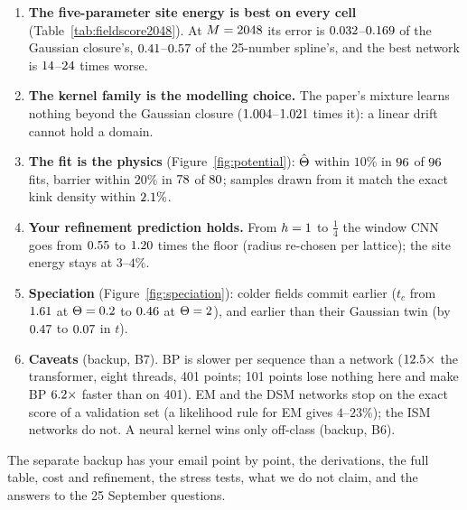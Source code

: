 \documentclass[11pt,a4paper]{article}
\begin{document}
\begin{enumerate}[leftmargin=1.6em]
\item \textbf{The five-parameter site energy is best on every cell} (Table~\ref{tab:fieldscore2048}). At $M=2048$ its error is
$0.032$--$0.169$ of the Gaussian closure's, $0.41$--$0.57$ of the
25-number spline's, and the best network is $14$--$24$ times worse.
\item \textbf{The kernel family is the modelling choice.} The paper's mixture learns nothing beyond the Gaussian closure
($1.004$--$1.021$ times it): a linear drift cannot hold a domain.
\item \textbf{The fit is the physics} (Figure~\ref{fig:potential}): $\hat{\Theta}$ within $10\%$ in $96$ of
$96$ fits, barrier within $20\%$ in $78$ of $80$; samples drawn from it match the exact
kink density within $2.1\%$.
\item \textbf{Your refinement prediction holds.} From $h=1$ to $\tfrac14$ the window CNN goes from $0.55$ to
$1.20$ times the floor (radius re-chosen per lattice); the site energy stays at $3$--$4\%$.
\item \textbf{Speciation} (Figure~\ref{fig:speciation}): colder fields commit earlier ($t_c$ from $1.61$ at $\Theta=0.2$
to $0.46$ at $\Theta=2$), and earlier than their Gaussian twin (by $0.47$ to $0.07$ in $t$).
\item \textbf{Caveats} (backup, B7). BP is slower per sequence than a network ($12.5\times$ the transformer,
eight threads, 401 points; 101 points lose nothing here and make BP $6.2\times$ faster than on 401). EM and
the DSM networks stop on the exact score of a validation set (a likelihood rule for EM gives $4$--$23\%$); the ISM networks do not.
A neural kernel wins only off-class (backup, B6).
\end{enumerate}

{\small The separate backup has your email point by point, the derivations, the full table, cost and refinement, the
stress tests, what we do not claim, and the answers to the 25 September questions.\par}
\end{document}

